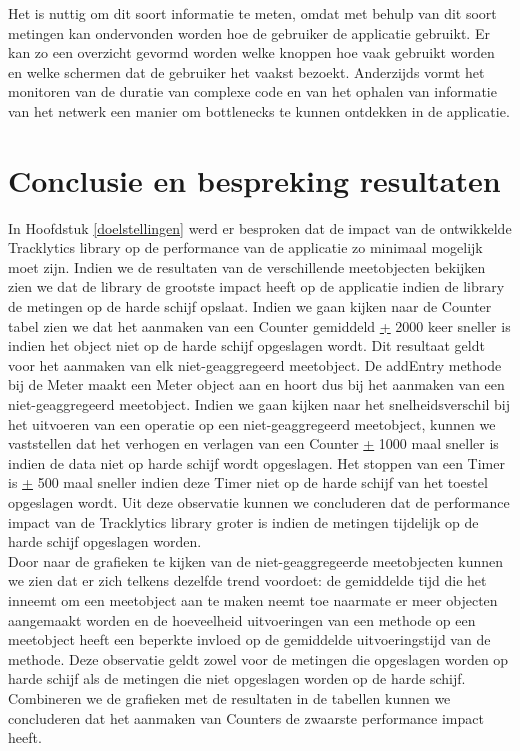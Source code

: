 Het is nuttig om dit soort informatie te meten, omdat met behulp van dit soort metingen kan ondervonden worden hoe de gebruiker de applicatie gebruikt. Er kan zo een overzicht gevormd worden welke knoppen hoe vaak gebruikt worden en welke schermen dat de gebruiker het vaakst bezoekt. Anderzijds vormt het monitoren van de duratie van complexe code en van het ophalen van informatie van het netwerk een manier om bottlenecks te kunnen ontdekken in de applicatie. 

\section{Conclusie en bespreking resultaten}\label{Section:Conclusie}
In Hoofdstuk \ref{doelstellingen} werd er besproken dat de impact van de ontwikkelde Tracklytics library op de performance van de applicatie zo minimaal mogelijk moet zijn. Indien we de resultaten van de verschillende meetobjecten bekijken zien we dat de library de grootste impact heeft op de applicatie indien de library de metingen op de harde schijf opslaat. Indien we gaan kijken naar de Counter tabel zien we dat het aanmaken van een Counter gemiddeld \underline{+} 2000 keer sneller is indien het object niet op de harde schijf opgeslagen wordt. Dit resultaat geldt voor het aanmaken van elk niet-geaggregeerd meetobject. De addEntry methode bij de Meter maakt een Meter object aan en hoort dus bij het aanmaken van een niet-geaggregeerd meetobject. Indien we gaan kijken naar het snelheidsverschil bij het uitvoeren van een operatie op een niet-geaggregeerd meetobject, kunnen we vaststellen dat het verhogen en verlagen van een Counter \underline{+} 1000 maal sneller is indien de data niet op harde schijf wordt opgeslagen. Het stoppen van een Timer is \underline{+} 500 maal sneller indien deze Timer niet op de harde schijf van het toestel opgeslagen wordt. Uit deze observatie kunnen we concluderen dat de performance impact van de Tracklytics library groter is indien de metingen tijdelijk op de harde schijf opgeslagen worden. \\

Door naar de grafieken te kijken van de niet-geaggregeerde meetobjecten kunnen we zien dat er zich telkens dezelfde trend voordoet: de gemiddelde tijd die het inneemt om een meetobject aan te maken neemt toe naarmate er meer objecten aangemaakt worden en de hoeveelheid uitvoeringen van een methode op een meetobject heeft een beperkte invloed op de gemiddelde uitvoeringstijd van de methode. Deze observatie geldt zowel voor de metingen die opgeslagen worden op harde schijf als de metingen die niet opgeslagen worden op de harde schijf. Combineren we de grafieken met de resultaten in de tabellen kunnen we concluderen dat het aanmaken van Counters de zwaarste performance impact heeft. \\

